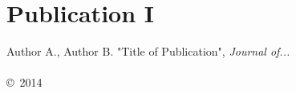 \documentclass[twoside,b5paper,openright]{memoir}
\begin{document}
\frontmatter




\cleardoublepage
\tableofcontents* %








\mainmatter






\backmatter



%







\renewcommand\appendixpagename{Publications}
\renewcommand\appendixtocname{Publications}

\appendix
\begingroup
\makeatletter
\let\ps@plain\ps@empty
\appendixpage
\makeatother
\endgroup


\chapter*{Publication I}
\thispagestyle{empty}
Author A., Author B. "Title of Publication", \emph{Journal of...}
\\\\
\noindent\copyright\ 2014 

% 
\end{document}
